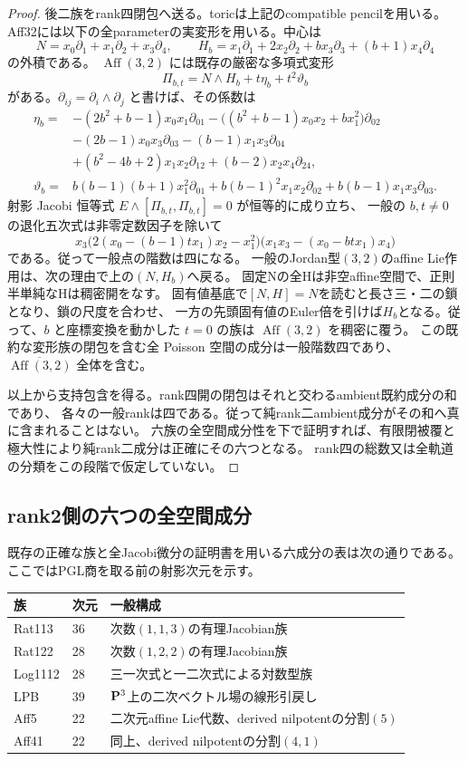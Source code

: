 \begin{proof}
後二族をrank四閉包へ送る。toricは上記のcompatible pencilを用いる。
Aff32には以下の全parameterの実変形を用いる。中心は
\[
 N=x_0\partial_1+x_1\partial_2+x_3\partial_4,\qquad
 H_b=x_1\partial_1+2x_2\partial_2+bx_3\partial_3+(b+1)x_4\partial_4
\]
の外積である。
$\operatorname{Aff}(3,2)$ には既存の厳密な多項式変形
\[
 \Pi_{b,t}=N\wedge H_b+t\eta_b+t^2\vartheta_b
\]
がある。$\partial_{ij}=\partial_i\wedge\partial_j$ と書けば、その係数は
\begin{align*}
 \eta_b={}&-(2b^2+b-1)x_0x_1\partial_{01}
 -\bigl((b^2+b-1)x_0x_2+b x_1^2\bigr)\partial_{02}\\
 &-(2b-1)x_0x_3\partial_{03}
 -(b-1)x_1x_3\partial_{04}\\
 &+(b^2-4b+2)x_1x_2\partial_{12}
 +(b-2)x_2x_4\partial_{24},\\
 \vartheta_b={}&b(b-1)(b+1)x_1^2\partial_{01}
 +b(b-1)^2x_1x_2\partial_{02}
 +b(b-1)x_1x_3\partial_{03}.
\end{align*}
射影 Jacobi 恒等式 $E\wedge[\Pi_{b,t},\Pi_{b,t}]=0$ が恒等的に成り立ち、
一般の $b,t\ne0$ の退化五次式は非零定数因子を除いて
\[
 x_3\bigl(2(x_0-(b-1)t x_1)x_2-x_1^2\bigr)
 \bigl(x_1x_3-(x_0-b t x_1)x_4\bigr)
\]
である。従って一般点の階数は四になる。
一般のJordan型$(3,2)$のaffine Lie作用は、次の理由で上の$(N,H_b)$へ戻る。
固定Nの全Hは非空affine空間で、正則半単純なHは稠密開をなす。
固有値基底で$[N,H]=N$を読むと長さ三・二の鎖となり、鎖の尺度を合わせ、
一方の先頭固有値のEuler倍を引けば$H_b$となる。従って、$b$ と座標変換を動かした $t=0$ の族は
$\operatorname{Aff}(3,2)$ を稠密に覆う。
この既約な変形族の閉包を含む全 Poisson 空間の成分は一般階数四であり、
$\overline{\operatorname{Aff}(3,2)}$ 全体を含む。


以上から支持包含を得る。rank四開の閉包はそれと交わるambient既約成分の和であり、
各々の一般rankは四である。従って純rank二ambient成分がその和へ真に含まれることはない。
六族の全空間成分性を下で証明すれば、有限閉被覆と極大性により純rank二成分は正確にその六つとなる。
rank四の総数又は全軌道の分類をこの段階で仮定していない。
\end{proof}

\subsection{rank2側の六つの全空間成分}
既存の正確な族と全Jacobi微分の証明書を用いる六成分の表は次の通りである。
ここではPGL商を取る前の射影次元を示す。
\begin{center}
\begin{tabular}{lll}
\toprule
族&次元&一般構成\\
\midrule
Rat113&36&次数$(1,1,3)$の有理Jacobian族\\
Rat122&28&次数$(1,2,2)$の有理Jacobian族\\
Log1112&28&三一次式と一二次式による対数型族\\
LPB&39&$\mathbf P^3$上の二次ベクトル場の線形引戻し\\
Aff5&22&二次元affine Lie代数、derived nilpotentの分割$(5)$\\
Aff41&22&同上、derived nilpotentの分割$(4,1)$\\
\bottomrule
\end{tabular}
\end{center}

